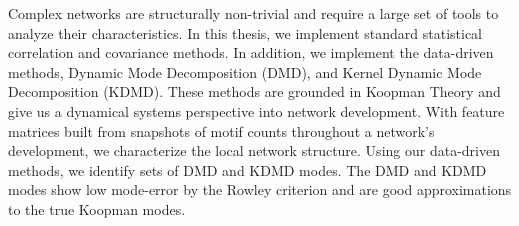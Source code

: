 

Complex networks are structurally non-trivial and require a large set of
tools to analyze their characteristics. In this thesis, we implement standard statistical correlation and
covariance methods. In addition, we implement the data-driven methods, Dynamic Mode Decomposition (DMD), and Kernel
Dynamic Mode Decomposition (KDMD). These methods are grounded in Koopman Theory and give us a dynamical systems perspective into 
network development. With feature matrices built from snapshots of motif counts throughout a 
network's development, we 
characterize the local network structure. Using our data-driven methods, we identify sets of DMD and KDMD modes. The DMD and KDMD
modes show low mode-error by the Rowley criterion and are good approximations to the true Koopman modes.


